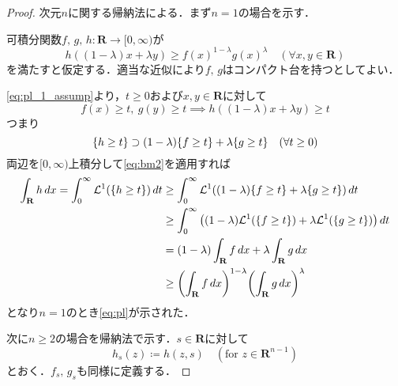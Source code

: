 \documentclass[a4j]{ltjsarticle}
\newcommand{\Rset}{\mathbf{R}}
\newcommand{\Lm}{\mathcal{L}}
\newcommand{\1}{\bm{1}}
\numberwithin{equation}{section}
\theoremstyle{definition}
\begin{document}
\begin{proof}
    次元$n$に関する帰納法による．まず$n=1$の場合を示す．

    可積分関数$f,\,g,\,h\colon \Rset\to [0,\infty)$が
    \begin{equation}
        h((1-\lambda)x+\lambda y)\geq f(x)^{1-\lambda}g(x)^{\lambda}\quad (\forall x,y\in\Rset)\label{eq:pl_1_assump}
    \end{equation}
    を満たすと仮定する．適当な近似により$f,\,g$はコンパクト台を持つとしてよい．

    \eqref{eq:pl_1_assump}より，$t\geq0$および$x,y\in\Rset$に対して
    \begin{equation}
        f(x)\geq t,\ g(y)\geq t\implies h((1-\lambda)x+\lambda y)\geq t
    \end{equation}
    つまり
    \begin{equation}
        \qty{h\geq t}\supset (1-\lambda)\qty{f\geq t}+\lambda \qty{g\geq t}\quad (\forall t\geq0)
    \end{equation}
    両辺を$[0,\infty)$上積分して\eqref{eq:bm2}を適用すれば
    \begin{align}
        \int_{\Rset}h\,dx=\int_{0}^{\infty}\Lm^1(\qty{h\geq t})\,dt&\geq \int_{0}^{\infty}\Lm^1((1-\lambda)\qty{f\geq t}+\lambda \qty{g\geq t})\,dt\\
        &\geq \int_{0}^{\infty}\qty((1-\lambda)\Lm^1(\qty{f\geq t})+\lambda \Lm^1(\qty{g\geq t}))\,dt\\
        &=(1-\lambda)\int_{\Rset}f\,dx+\lambda\int_{\Rset}g\,dx\\
        &\geq \qty(\int_{\Rset}f\,dx)^{1-\lambda}\qty(\int_{\Rset}g\,dx)^{\lambda}
    \end{align}
    となり$n=1$のとき\eqref{eq:pl}が示された．

    次に$n\geq 2$の場合を帰納法で示す．$s\in\Rset$に対して
    \begin{equation}
        h_s(z)\coloneqq h(z,s)\quad (\text{for }z\in\Rset^{n-1})
    \end{equation}
    とおく．$f_s,\,g_s$も同様に定義する．
    

\end{proof}
\end{document}
